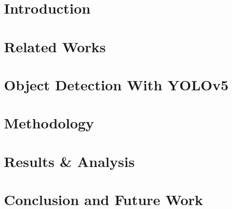 \documentclass[12pt,a4paper]{report}
\begin{document}






\newpage
{}


\newpage
{}



\tableofcontents
\listoffigures
\listoftables

\newpage

\chapter{Introduction}
\label{chap:intro}



\newpage

\chapter{Related Works}
\label{chap:related-works}


\newpage

\chapter{Object Detection With YOLOv5}
\label{chap:object-detection-with-yolo}




\newpage

\chapter{Methodology}
\label{chap:methodology}



\newpage

\chapter{ Results \& Analysis}
\label{chap:results-analysis}


\newpage

\chapter{Conclusion and Future Work}
\label{chap:conclusion-future-work}


\printbibliography[heading=bibintoc, title={Bibliography}]
\end{document}
